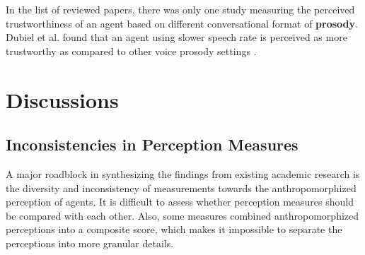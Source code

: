 \documentclass[sigconf,screen,review, anonymous]{acmart}
\newcommand{\cmt}[1]{}%
\begin{document}




In the list of reviewed papers, there was only one study measuring the perceived trustworthiness of an agent based on different conversational format of \textbf{prosody}. Dubiel et al. found that an agent using slower speech rate is perceived as more trustworthy as compared to other voice prosody settings \cite{dubiel2020persuasive}\cmt{[60]}.



\section{Discussions}

\subsection{Inconsistencies in Perception Measures}

A major roadblock in synthesizing the findings from existing academic research is the diversity and inconsistency of measurements towards the anthropomorphized perception of agents. It is difficult to assess whether perception measures should be compared with each other. Also, some measures combined anthropomorphized perceptions into a composite score, which makes it impossible to separate the perceptions into more granular details.
\end{document}
